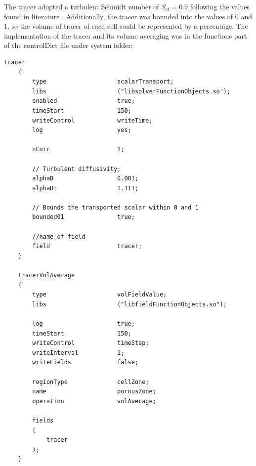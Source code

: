 \documentclass[../main.tex]{subfiles}
\begin{document}
The tracer adopted a turbulent Schmidt number of $S_{ct}=0.9$ following the values found in literature \cite{gualtieri2010}. Additionally, the tracer was bounded into the values of 0 and 1, so the volume of tracer of each cell could be represented by a percentage. The implementation of the tracer and its volume averaging was in the functions part of the controlDict file under system folder:
\begin{lstlisting}
tracer
	{
		type 					scalarTransport;
		libs					("libsolverFunctionObjects.so");
		enabled					true;
		timeStart				150;
		writeControl			writeTime;
		log						yes;

		nCorr					1;

		// Turbulent diffusivity;
		alphaD					0.001;
		alphaDt					1.111;
		
		// Bounds the transported scalar within 0 and 1
		bounded01				true;
		
		//name of field
		field					tracer;
	}
	
	tracerVolAverage
	{
		type            		volFieldValue;
		libs            		("libfieldFunctionObjects.so");
	
		log             		true;
		timeStart				150;
		writeControl			timeStep;
		writeInterval			1;
		writeFields     		false;
			
		regionType      		cellZone;
		name            		porousZone;
		operation       		volAverage;
	
		fields
		(
			tracer
		);
	}
\end{lstlisting}
\end{document}
